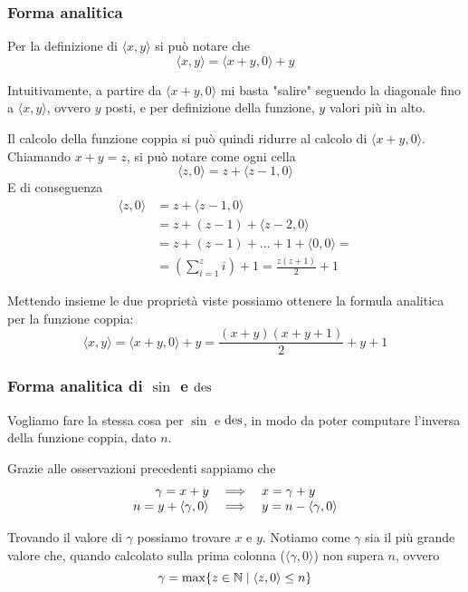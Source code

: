 \subsubsection{Forma analitica} 
Per la definizione di $\langle x,y \rangle$ si può notare che
$$ \langle x,y \rangle = \langle x + y,0 \rangle + y $$

\begin{center}
	
\end{center}

Intuitivamente, a partire da $\langle x + y, 0\rangle$ mi basta "salire" seguendo la diagonale fino a $\langle x,y \rangle$, ovvero $y$ posti, e per definizione della funzione, $y$ valori più in alto.

Il calcolo della funzione coppia si può quindi ridurre al calcolo di $\langle x + y, 0 \rangle$. Chiamando $x + y = z$, si può notare come ogni cella
$$ \langle z,0 \rangle = z + \langle z - 1, 0 \rangle $$
E di conseguenza
\begin{align*}
	\langle z,0 \rangle & = z + \langle z - 1, 0 \rangle \\
	& = z + (z-1) + \langle z-2, 0 \rangle \\
	& = z + (z-1) + \dots + 1 + \langle 0,0 \rangle = \\
	& = \left( \sum_{i=1}^{z} i \right) + 1 = \frac{z(z+1)}{2} + 1
\end{align*}

Mettendo insieme le due proprietà viste possiamo ottenere la formula analitica per la funzione coppia: 
$$ \langle x,y \rangle = \langle x + y, 0 \rangle + y = \frac{(x + y) (x + y + 1)}{2} + y + 1 $$

\subsubsection{Forma analitica di $\sin$ e $\operatorname{des}$}

Vogliamo fare la stessa cosa per $\sin$ e $\operatorname{des}$, in modo da poter computare l'inversa della funzione coppia, dato $n$.

Grazie alle osservazioni precedenti sappiamo che
$$ \begin{array}{r c l}
	\gamma = x + y & \implies & x = \gamma + y \\
	n = y + \langle \gamma , 0 \rangle & \implies & y = n - \langle \gamma , 0 \rangle \\
\end{array} $$

Trovando il valore di $\gamma$ possiamo trovare $x$ e $y$. Notiamo come $\gamma$ sia il più grande valore che, quando calcolato sulla prima colonna ($\langle \gamma, 0 \rangle$) non supera $n$, ovvero
$$ \gamma = \max \{z \in \mathbb{N} \mid \langle z, 0 \rangle \leq n \} $$

